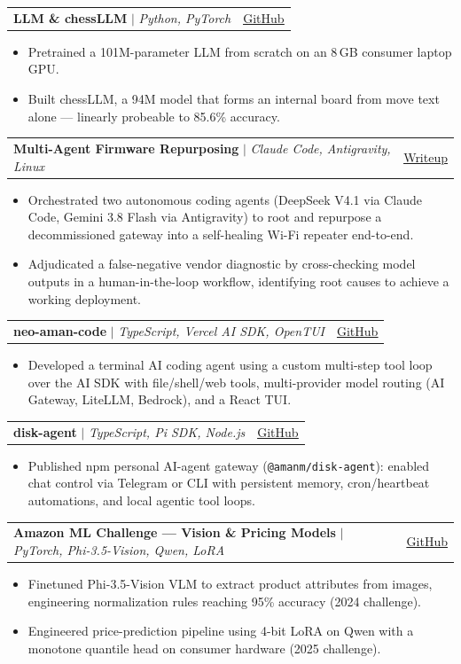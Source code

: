 \documentclass[letterpaper,10.5pt]{article}
\makeatletter
\newcommand{\resumeItem}[1]{
  \item\small{
    {#1 \vspace{-2pt}}
  }
}
\newcommand{\resumeProjectHeading}[2]{
    \item
    \begin{tabular*}{0.97\textwidth}{l@{\extracolsep{\fill}}r}
      \small#1 & #2 \\
    \end{tabular*}\vspace{-6pt}
}
\newcommand{\resumeItemListStart}{\begin{itemize}}
\newcommand{\resumeItemListEnd}{\end{itemize}\vspace{-5pt}}
\makeatother
\begin{document}
      \resumeProjectHeading
          {\textbf{LLM \& chessLLM} $|$ \emph{Python, PyTorch}}{\href{https://github.com/amanmprojects}{\underline{GitHub}}}
          \resumeItemListStart
            \resumeItem{Pretrained a 101M-parameter LLM from scratch on an 8\,GB consumer laptop GPU.}
            \resumeItem{Built chessLLM, a 94M model that forms an internal board from move text alone --- linearly probeable to 85.6\% accuracy.}
          \resumeItemListEnd

      \resumeProjectHeading
          {\textbf{Multi-Agent Firmware Repurposing} $|$ \emph{Claude Code, Antigravity, Linux}}{\href{https://aman-on-bits.vercel.app/writing/repurposing-jiofiber-wireless-repeater}{\underline{Writeup}}}
          \resumeItemListStart
            \resumeItem{Orchestrated two autonomous coding agents (DeepSeek V4.1 via Claude Code, Gemini 3.8 Flash via Antigravity) to root and repurpose a decommissioned gateway into a self-healing Wi-Fi repeater end-to-end.}
            \resumeItem{Adjudicated a false-negative vendor diagnostic by cross-checking model outputs in a human-in-the-loop workflow, identifying root causes to achieve a working deployment.}
          \resumeItemListEnd

      \resumeProjectHeading
          {\textbf{neo-aman-code} $|$ \emph{TypeScript, Vercel AI SDK, OpenTUI}}{\href{https://github.com/amanmprojects/neo-aman-code}{\underline{GitHub}}}
          \resumeItemListStart
            \resumeItem{Developed a terminal AI coding agent using a custom multi-step tool loop over the AI SDK with file/shell/web tools, multi-provider model routing (AI Gateway, LiteLLM, Bedrock), and a React TUI.}
          \resumeItemListEnd

      \resumeProjectHeading
          {\textbf{disk-agent} $|$ \emph{TypeScript, Pi SDK, Node.js}}{\href{https://github.com/amanmprojects/disk-agent}{\underline{GitHub}}}
          \resumeItemListStart
            \resumeItem{Published npm personal AI-agent gateway (\texttt{@amanm/disk-agent}): enabled chat control via Telegram or CLI with persistent memory, cron/heartbeat automations, and local agentic tool loops.}
          \resumeItemListEnd

      \resumeProjectHeading
          {\textbf{Amazon ML Challenge --- Vision \& Pricing Models} $|$ \emph{PyTorch, Phi-3.5-Vision, Qwen, LoRA}}{\href{https://github.com/amanmprojects}{\underline{GitHub}}}
          \resumeItemListStart
            \resumeItem{Finetuned Phi-3.5-Vision VLM to extract product attributes from images, engineering normalization rules reaching 95\% accuracy (2024 challenge).}
            \resumeItem{Engineered price-prediction pipeline using 4-bit LoRA on Qwen with a monotone quantile head on consumer hardware (2025 challenge).}
          \resumeItemListEnd
\end{document}
